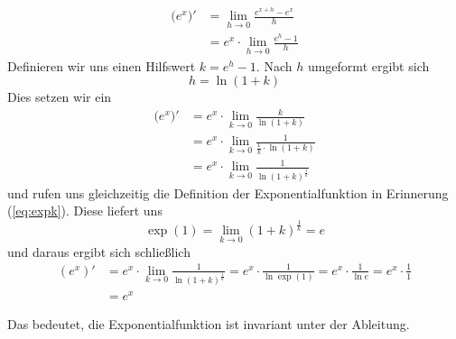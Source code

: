 \begin{equation}
\begin{split}
\big(e^x\big)' &= \lim_{h\rightarrow 0} \frac{e^{x+h}-e^x}{h} \\
&= e^x \cdot \lim_{h\rightarrow 0} \frac{e^{h}-1}{h}
\end{split}
\end{equation}
Definieren wir uns einen Hilfswert $k = e^h-1$. Nach $h$ umgeformt ergibt sich
\begin{equation}
h = \ln (1+k)
\end{equation}
Dies setzen wir ein
\begin{equation}
\begin{split}
\big(e^x\big)' &= e^x\cdot \lim_{k\rightarrow 0} \frac{k}{\ln (1+k)}\\
&= e^x\cdot \lim_{k\rightarrow 0} \frac{1}{\frac{1}{k}\cdot \ln (1+k)} \\
&= e^x\cdot \lim_{k\rightarrow 0} \frac{1}{\ln (1+k)^{\frac{1}{k}} }
\end{split}
\end{equation}
und rufen uns gleichzeitig die Definition der Exponentialfunktion in Erinnerung (\ref{eq:expk}). Diese liefert uns
\begin{equation}
\exp(1) = \lim_{k\rightarrow 0} (1+k)^{\frac{1}{k}} = e
\end{equation}
und daraus ergibt sich schließlich
\begin{equation}
\begin{split}
(e^x)' &= e^x\cdot \lim_{k\rightarrow 0} \frac{1}{\ln (1+k)^{\frac{1}{k}} }= e^x\cdot \frac{1}{\ln \exp(1) } = e^x\cdot \frac{1}{\ln e } = e^x\cdot \frac{1}{1}\\
&= e^x
\end{split}
\end{equation}

Das bedeutet, die Exponentialfunktion ist invariant unter der Ableitung. 


